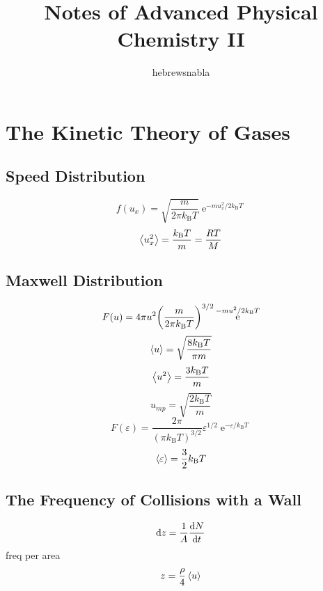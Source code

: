\documentclass[a4paper]{article}
\title{Notes of \textbf{Advanced Physical Chemistry II}}
\author{hebrewsnabla}
\DeclareMathOperator{\e}{\mathrm{e}}
\newcommand{\kB}{k_\mathrm{B}}
\numberwithin{equation}{section}
\begin{document}
\maketitle

\tableofcontents

\newpage


\setcounter{section}{24}
\section{The Kinetic Theory of Gases}
\subsection{}
\subsection{Speed Distribution}
\begin{equation}\label{key}
f(u_x) = \sqrt{\dfrac{m}{2\pi\kB T}}\e^{-m u_x^2/2\kB T}
\end{equation}
\begin{equation}\label{key}
\ev{u_x^2} = \dfrac{\kB T}{m} = \dfrac{R T}{M}
\end{equation}

\subsection{Maxwell Distribution}
\begin{equation}\label{key}
F(u) = 4\pi u^2 \qty(\dfrac{m}{2\pi\kB T})^{3/2}\e^{-m u^2/2\kB T}
\end{equation}
\begin{equation}\label{key}
\ev{u} = \sqrt{\dfrac{8\kB T}{\pi m}}
\end{equation}
\begin{equation}\label{key}
\ev{u^2} = \dfrac{3\kB T}{m}
\end{equation}
\begin{equation}\label{key}
u_{mp} = \sqrt{\dfrac{2\kB T}{m}}
\end{equation}
\begin{equation}\label{key}
F(\varepsilon) = \dfrac{2\pi}{(\pi \kB T)^{3/2}}\varepsilon^{1/2}\e^{-\varepsilon/\kB T}
\end{equation}
\begin{equation}\label{key}
\ev{\varepsilon} = \dfrac{3}{2}\kB T
\end{equation}

\subsection{The Frequency of Collisions with a Wall}
\begin{equation}\label{key}
\dd z = \dfrac{1}{A}\dv{N}{t}
\end{equation}
freq per area
\begin{equation}\label{key}
z = \dfrac{\rho}{4}\ev{u}
\end{equation}
\end{document}
